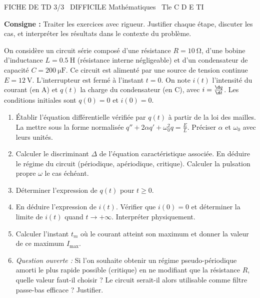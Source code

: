 \documentclass[11pt]{article}
\begin{document}
\begin{tcolorbox}[enhanced,colback=popink,colframe=popink,arc=10pt,boxrule=0pt,left=12pt,right=12pt,top=9pt,bottom=9pt]
{\color{white}\popxbold\small FICHE DE TD 3/3 \textbullet\ DIFFICILE \hfill Mathématiques \textbullet\ Tle C D E TI\par}
\end{tcolorbox}
\vspace{4pt}
\noindent\textbf{Consigne :} Traiter les exercices avec rigueur. Justifier chaque étape, discuter les cas, et interpréter les résultats dans le contexte du problème.

\begin{exercice}
On considère un circuit série composé d'une résistance $R = \SI{10}{\ohm}$, d'une bobine d'inductance $L = \SI{0,5}{\henry}$ (résistance interne négligeable) et d'un condensateur de capacité $C = \SI{200}{\micro\farad}$. Ce circuit est alimenté par une source de tension continue $E = \SI{12}{\volt}$. L'interrupteur est fermé à l'instant $t=0$. On note $i(t)$ l'intensité du courant (en A) et $q(t)$ la charge du condensateur (en C), avec $i = \frac{\d q}{\d t}$. Les conditions initiales sont $q(0)=0$ et $i(0)=0$.
\begin{enumerate}
    \item Établir l'équation différentielle vérifiée par $q(t)$ à partir de la loi des mailles. La mettre sous la forme normalisée $q'' + 2\alpha q' + \omega_0^2 q = \frac{E}{L}$. Préciser $\alpha$ et $\omega_0$ avec leurs unités.
    \item Calculer le discriminant $\Delta$ de l'équation caractéristique associée. En déduire le régime du circuit (périodique, apériodique, critique). Calculer la pulsation propre $\omega$ le cas échéant.
    \item Déterminer l'expression de $q(t)$ pour $t \ge 0$.
    \item En déduire l'expression de $i(t)$. Vérifier que $i(0)=0$ et déterminer la limite de $i(t)$ quand $t \to +\infty$. Interpréter physiquement.
    \item Calculer l'instant $t_m$ où le courant atteint son maximum et donner la valeur de ce maximum $I_{\max}$.
    \item \textit{Question ouverte :} Si l'on souhaite obtenir un régime pseudo-périodique amorti le plus rapide possible (critique) en ne modifiant que la résistance $R$, quelle valeur faut-il choisir ? Le circuit serait-il alors utilisable comme filtre passe-bas efficace ? Justifier.
\end{enumerate}
\end{exercice}
\end{document}
